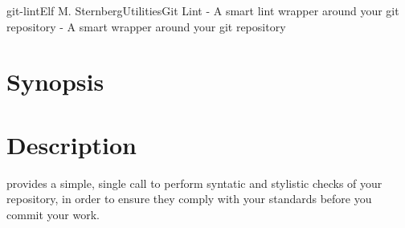 \documentclass[english]{article}
\begin{document}
\begin{Name}{1}{git-lint}{Elf M. Sternberg}{Utilities}{Git Lint - A smart lint wrapper around your git repository}
   - A smart wrapper around your git repository
\end{Name}

\section{Synopsis}


\section{Description}
 provides a simple, single call to perform syntatic and stylistic
checks of your repository, in order to ensure they comply with your standards
before you commit your work.
\end{document}
